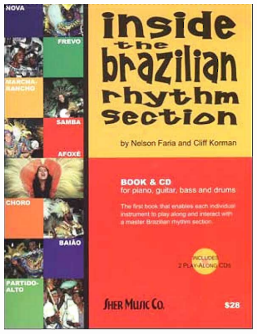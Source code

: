 \documentclass[a4paper]{book}
\begin{document}
\begin{center}
\includegraphics[width=14.101cm,height=18.44cm]{lebluessupportsmethodes-img170.png}
\end{center}
\end{document}
